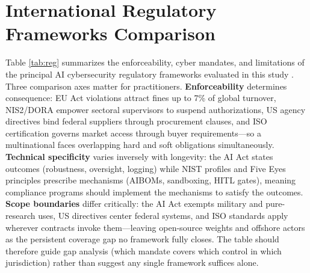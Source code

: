 \documentclass[conference,10pt,twocolumn,a4paper]{IEEEtran}
\begin{document}
\begin{table}[t]
\caption{Condensed MITRE ATLAS $\times$ NIST Adversarial AI Mapping}
\label{tab:atlas}
\centering
{}
\end{table}

\section{International Regulatory Frameworks Comparison}
\label{app:c}
Table \ref{tab:reg} summarizes the enforceability, cyber mandates, and limitations of the principal AI cybersecurity regulatory frameworks evaluated in this study \cite{eu_ai_act_2024, nist_sp_1270_ai_rmf, nist_csf_ai_2026, cisa_agentic_ai_2026}. Three comparison axes matter for practitioners. \textbf{Enforceability} determines consequence: EU Act violations attract fines up to 7\% of global turnover, NIS2/DORA empower sectoral supervisors to suspend authorizations, US agency directives bind federal suppliers through procurement clauses, and ISO certification governs market access through buyer requirements---so a multinational faces overlapping hard and soft obligations simultaneously. \textbf{Technical specificity} varies inversely with longevity: the AI Act states outcomes (robustness, oversight, logging) while NIST profiles and Five Eyes principles prescribe mechanisms (AIBOMs, sandboxing, HITL gates), meaning compliance programs should implement the mechanisms to satisfy the outcomes. \textbf{Scope boundaries} differ critically: the AI Act exempts military and pure-research uses, US directives center federal systems, and ISO standards apply wherever contracts invoke them---leaving open-source weights and offshore actors as the persistent coverage gap no framework fully closes. The table should therefore guide gap analysis (which mandate covers which control in which jurisdiction) rather than suggest any single framework suffices alone.
\end{document}
